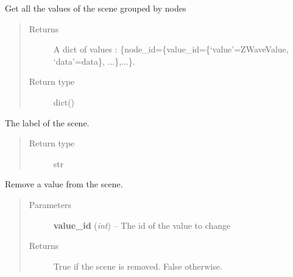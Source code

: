 \documentclass[letterpaper,10pt,english]{sphinxmanual}
\begin{document}
\begin{fulllineitems}
\begin{fulllineitems}
\end{fulllineitems}


\begin{fulllineitems}
\label{scene:openzwave.scene.ZWaveScene.get_values_by_node}
Get all the values of the scene grouped by nodes
\begin{quote}\begin{description}
\item[{Returns}] \leavevmode
A dict of values : \{node\_id=\{value\_id=\{`value'=ZWaveValue, `data'=data\}, ...\},...\}.

\item[{Return type}] \leavevmode
dict()

\end{description}\end{quote}

\end{fulllineitems}


\begin{fulllineitems}
\label{scene:openzwave.scene.ZWaveScene.label}
The label of the scene.
\begin{quote}\begin{description}
\item[{Return type}] \leavevmode
str

\end{description}\end{quote}

\end{fulllineitems}


\begin{fulllineitems}
\label{scene:openzwave.scene.ZWaveScene.remove_value}
Remove a value from the scene.
\begin{quote}\begin{description}
\item[{Parameters}] \leavevmode
\textbf{value\_id} (\emph{int}) -- The id of the value to change

\item[{Returns}] \leavevmode
True if the scene is removed. False otherwise.


\end{description}
\end{quote}
\end{fulllineitems}
\end{fulllineitems}
\end{document}
